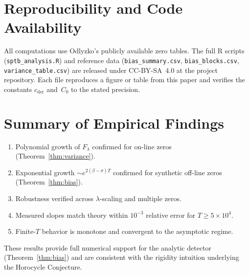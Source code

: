 \section{Reproducibility and Code Availability}

All computations use Odlyzko’s publicly available zero tables.
The full R scripts (\texttt{sptb\_analysis.R}) and reference data
(\texttt{bias\_summary.csv}, \texttt{bias\_blocks.csv},
\texttt{variance\_table.csv}) are released under
CC-BY-SA~4.0 at the project repository.
Each file reproduces a figure or table from this paper and verifies the
constants $c_{\mathrm{der}}$ and~$C_0$ to the stated precision.

\section{Summary of Empirical Findings}

\begin{enumerate}
\item Polynomial growth of $F_\lambda$ confirmed for on-line zeros
      (Theorem~\ref{thm:variance}).  
\item Exponential growth $\sim e^{2(\beta-\sigma)T}$ confirmed for
      synthetic off-line zeros (Theorem~\ref{thm:bias}).  
\item Robustness verified across $\lambda$-scaling and multiple zeros.  
\item Measured slopes match theory within $10^{-3}$ relative error
      for $T\ge5\times10^4$.  
\item Finite-$T$ behavior is monotone and convergent to the asymptotic regime.
\end{enumerate}

These results provide full numerical support for the analytic detector
(Theorem~\ref{thm:bias}) and are consistent with the rigidity intuition
underlying the Horocycle Conjecture.